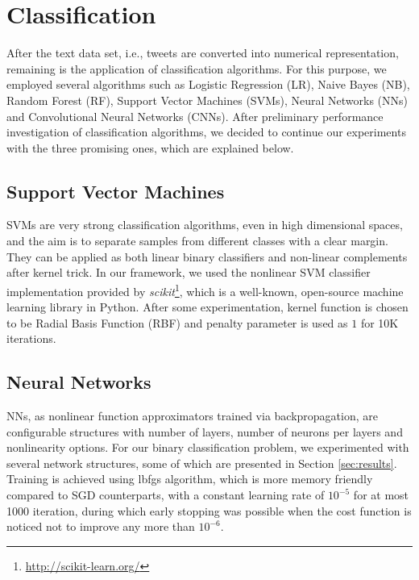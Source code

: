 \section{Classification}
\label{sec:modelSelection}
After the text data set, i.e., tweets are converted into numerical representation, remaining is the application of classification algorithms.
For this purpose, we employed several algorithms such as Logistic Regression (LR), Naive Bayes (NB), Random Forest (RF), Support Vector Machines (SVMs), Neural Networks (NNs) and Convolutional Neural Networks (CNNs).
After preliminary performance investigation of classification algorithms, we decided to continue our experiments with the three promising ones, which are explained below.

\subsection{Support Vector Machines}
SVMs are very strong classification algorithms, even in high dimensional spaces, and the aim is to separate samples from different classes with a clear margin.
They can be applied as both linear binary classifiers and non-linear complements after kernel trick.
In our framework, we used the nonlinear SVM classifier implementation provided by \textit{scikit}\footnote{\url{http://scikit-learn.org/}}, which is a well-known, open-source machine learning library in Python.
After some experimentation, kernel function is chosen to be Radial Basis Function (RBF) and penalty parameter is used as $1$ for 10K iterations.


\subsection{Neural Networks}
NNs, as nonlinear function approximators trained via backpropagation, are configurable structures with number of layers, number of neurons per layers and nonlinearity options.
For our binary classification problem, we experimented with several network structures, some of which are presented in Section \ref{sec:results}.
Training is achieved using lbfgs algorithm, which is more memory friendly compared to SGD counterparts, with a constant learning rate of $10^{-5}$ for at most 1000 iteration, during which early stopping was possible when the cost function is noticed not to improve any more than $10^{-6}$.

